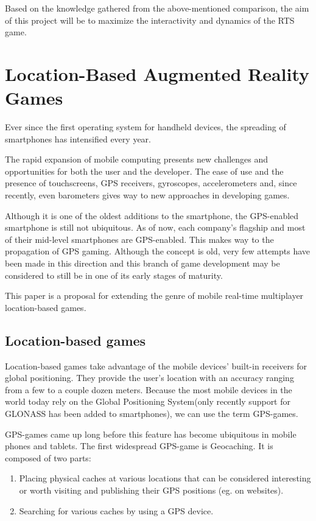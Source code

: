\documentclass{article}
\begin{document}
Based on the knowledge gathered from the above-mentioned comparison, the aim of
this project will be to maximize the interactivity and dynamics of the RTS game.


\section{Location-Based Augmented Reality Games}

Ever since the first operating system for handheld devices, the spreading of
smartphones has intensified every year.\newline

The rapid expansion of mobile computing presents new challenges and
opportunities for both the user and the developer. The ease of use and the
presence of touchscreens, GPS receivers, gyroscopes, accelerometers and, since
recently, even barometers gives way to new approaches in developing
games.\newline

Although it is one of the oldest additions to the smartphone, the GPS-enabled
smartphone is still not ubiquitous. As of now, each company's flagship
and most of their mid-level smartphones are GPS-enabled. This makes way to the
propagation of GPS gaming. Although the concept is old, very few attempts have
been made in this direction and this branch of game development may be
considered to still be in one of its early stages of maturity.\newline

This paper is a proposal for extending the genre of mobile real-time multiplayer
location-based games.

\subsection{Location-based games}
Location-based games take advantage of the mobile devices' built-in receivers
for global positioning. They provide the user's location with an accuracy
ranging from a few to a couple dozen meters. Because the most mobile
devices in the world today rely on the Global Positioning System(only recently
support for GLONASS has been added to smartphones), we can use the term
GPS-games.\newline

GPS-games came up long before this feature has become ubiquitous in mobile
phones and tablets. The first widespread GPS-game is Geocaching. It is composed
of two parts: 
\begin{enumerate}
  \item Placing physical caches at various locations that can be considered
  interesting or worth visiting and publishing their GPS positions (eg. on
  websites).
  \item Searching for various caches by using a GPS device. 
\end{enumerate}
\end{document}
